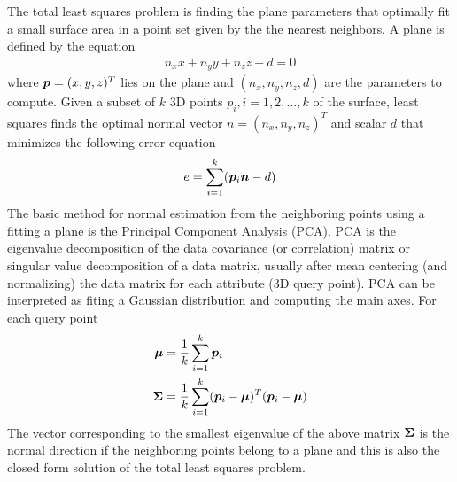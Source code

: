 \documentclass[twocolumn,oneside]{book}
\newcommand{\V}[1]{\vector{#1}}  %
\newcommand{\M}[1]{\V{#1}}    %
\begin{document}
\begin{itemize}
  The total least squares problem is finding the plane parameters
  that optimally fit a small surface area in a point set given by the 
  the nearest neighbors. A plane is defined by the equation
\begin{align*}
  n_x x + n_y y + n_z z - d = 0
\end{align*}  
  where $\V p = (x, y, z)^T$ lies on the plane and $(n_x, n_y, n_z,
  d)$ are the parameters to compute. Given a subset of $k$ 3D points
  $p_i, i = 1, 2, \ldots, k$ of the surface, least squares finds the
  optimal normal vector $n = (n_x, n_y, n_z )^T$ and scalar $d$ that
  minimizes the following error equation
\begin{align}
  e = \sum_{i=1}^k (\V p_i \V n - d)\label{eq:normal}
\end{align}  
  The basic method for normal estimation from the neighboring points
  using a fitting a plane is the Principal Component Analysis (PCA).
  PCA is the eigenvalue decomposition of the data covariance (or
  correlation) matrix or singular value decomposition of a data
  matrix, usually after mean centering (and normalizing) the data
  matrix for each attribute (3D query point). PCA can be interpreted
  as fiting a Gaussian distribution and computing the main axes. For
  each query point
\begin{align*}
  \V \mu    & = \frac{1}{k} \sum_{i=1}^{k} \V p_i \\
  \M \Sigma & = \frac{1}{k} \sum_{i=1}^{k} (\V p_i - \V \mu)^T(\V p_i - \V \mu)
\end{align*}
  The vector corresponding to the smallest eigenvalue of the above
  matrix $\M \Sigma$ is the normal direction if the neighboring
  points belong to a plane and this is also the closed form
  solution of the total least squares problem.


\end{itemize}
\end{document}

